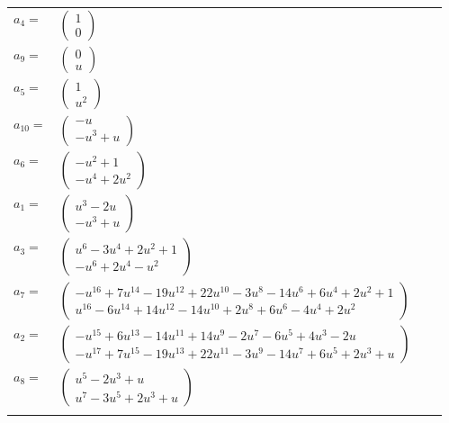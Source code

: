 \documentclass[1p]{elsarticle_modified}
\theoremstyle{definition}
\begin{document}
\begin{tabular}{m{7pt} m{180pt} m{7pt} m{180pt} }
\flushright $a_{4}=$&$\begin{pmatrix}1\\0\end{pmatrix}$ \\
\flushright $a_{9}=$&$\begin{pmatrix}0\\u\end{pmatrix}$ \\
\flushright $a_{5}=$&$\begin{pmatrix}1\\u^2\end{pmatrix}$ \\
\flushright $a_{10}=$&$\begin{pmatrix}- u\\- u^3+u\end{pmatrix}$ \\
\flushright $a_{6}=$&$\begin{pmatrix}- u^2+1\\- u^4+2 u^2\end{pmatrix}$ \\
\flushright $a_{1}=$&$\begin{pmatrix}u^3-2 u\\- u^3+u\end{pmatrix}$ \\
\flushright $a_{3}=$&$\begin{pmatrix}u^6-3 u^4+2 u^2+1\\- u^6+2 u^4- u^2\end{pmatrix}$ \\
\flushright $a_{7}=$&$\begin{pmatrix}- u^{16}+7 u^{14}-19 u^{12}+22 u^{10}-3 u^8-14 u^6+6 u^4+2 u^2+1\\u^{16}-6 u^{14}+14 u^{12}-14 u^{10}+2 u^8+6 u^6-4 u^4+2 u^2\end{pmatrix}$ \\
\flushright $a_{2}=$&$\begin{pmatrix}- u^{15}+6 u^{13}-14 u^{11}+14 u^9-2 u^7-6 u^5+4 u^3-2 u\\- u^{17}+7 u^{15}-19 u^{13}+22 u^{11}-3 u^9-14 u^7+6 u^5+2 u^3+u\end{pmatrix}$ \\
\flushright $a_{8}=$&$\begin{pmatrix}u^5-2 u^3+u\\u^7-3 u^5+2 u^3+u\end{pmatrix}$\\&\end{tabular}
\end{document}
